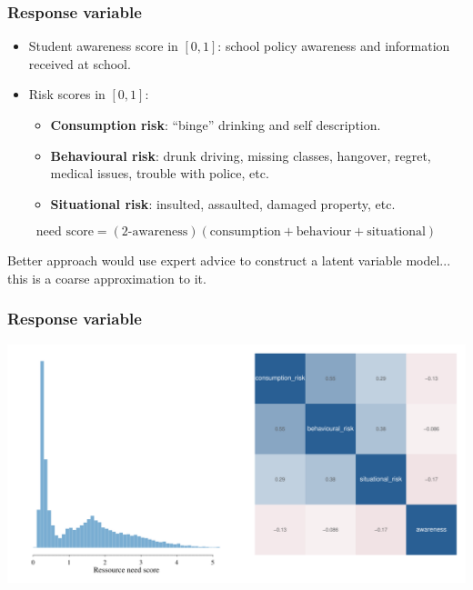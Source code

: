 \documentclass{beamer}
\begin{document}
\begin{frame} \frametitle{Response variable}

\begin{itemize}
  \item Student awareness score in $[0,1]$: school policy awareness and information received at school.
  \item Risk scores in $[0,1]$:
    \begin{itemize}
       \item \textbf{Consumption risk}: ``binge'' drinking and self description.
       \item \textbf{Behavioural risk}: drunk driving, missing classes, hangover, regret, medical issues, trouble with police, etc.
       \item \textbf{Situational risk}: insulted, assaulted, damaged property, etc.
    \end{itemize}
\end{itemize}

$$
  \text{need score} = (\text{2-awareness}) (\text{consumption} + \text{behaviour} + \text{situational})
$$

Better approach would use expert advice to construct a latent variable model... this is a coarse approximation to it.



\end{frame}

\begin{frame} \frametitle{Response variable}

  \begin{center}
    \includegraphics[width=\linewidth]{Figures/response}
  \end{center}

\end{frame}
\end{document}
